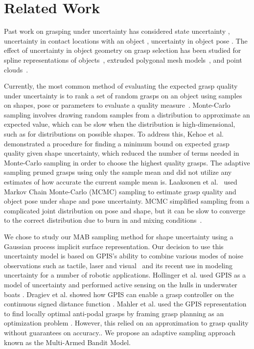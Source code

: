 \documentclass[letterpaper, 10 pt, conference]{ieeeconf}  %
\begin{document}
\section{Related Work}

Past work on grasping under uncertainty has considered state uncertainty \cite{goldberg1990bayesian, stulp2011learning}, uncertainty in contact locations with an object \cite{zheng2005}, uncertainty in object pose \cite{christopoulos2007handling, weisz2012pose, kim2012physically}.
The effect of uncertainty in object geometry on grasp selection has been studied for spline representations of objects~\cite{christopoulos2007handling}, extruded polygonal mesh models~\cite{kehoe2012estimating, kehoe2012toward}, and point clouds~\cite{hsiao2011bayesian}.

Currently, the most common method of evaluating the expected grasp quality under uncertainty is to rank a set of random grasps on an object using  samples on shapes, pose or parameters to evaluate a quality measure~\cite{christopoulos2007handling, kehoe2012estimating, kehoe2012toward}.
Monte-Carlo sampling involves drawing random samples from a distribution to approximate an expected value\cite{caflisch1998monte}, which can be slow when the distribution is high-dimensional, such as for distributions on possible shapes.
To address this, Kehoe et al.~\cite{kehoe2012estimating} demonstrated a procedure for finding a minimum bound on expected grasp quality given shape uncertainty, which reduced the number of terms needed in Monte-Carlo sampling in order to choose the highest quality grasps. The adaptive sampling pruned grasps using only the sample mean and did not utilize any estimates of how accurate the current sample mean is. 
Laaksonen et al.~\cite{laaksonen2012probabilistic} used Markov Chain Monte-Carlo (MCMC) sampling to estimate grasp quality and object pose  under shape and pose uncertainty.
MCMC simplified sampling from a complicated joint distribution on pose and shape, but it can be slow to converge to the correct distribution due to burn in and mixing conditions~\cite{andrieu2003introduction}.

We chose to study our MAB sampling method for shape uncertainty using a Gaussian process implicit surface representation. Our decision to use this uncertainty model is based on GPIS's ability to combine various modes of noise observations such as tactile, laser and visual~\cite{rasmussen2006, williams2007, dragiev2011} and its recent use in modeling uncertainty for a number of robotic applications.
Hollinger et al. used GPIS as a model of uncertainty and performed active sensing on the hulls in underwater boats \cite{hollinger2013}.
Dragiev et al. showed how GPIS can enable a grasp controller on the continuous signed distance function \cite{dragiev2011}.
Mahler et al. used the GPIS representation to find locally optimal anti-podal grasps by framing grasp planning as an optimization problem \cite{mahler2015opt}. However, this relied on an approximation to grasp quality without guarantees on accuracy.. We propose an adaptive sampling approach known as the Multi-Armed Bandit Model. 
\end{document}
